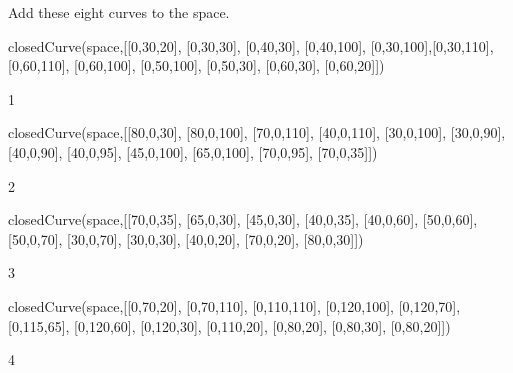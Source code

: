 \begin{xtc}
\begin{xtccomment}
Add these eight curves to the space.
\end{xtccomment}
\begin{spadsrc}
closedCurve(space,[[0,30,20], [0,30,30], [0,40,30], [0,40,100], [0,30,100],[0,30,110], [0,60,110], [0,60,100], [0,50,100], [0,50,30], [0,60,30], [0,60,20]]) 
\end{spadsrc}
\begin{TeXOutput}
\begin{fricasmath}{2}
1%
\end{fricasmath}
\end{TeXOutput}
\end{xtc}
\begin{xtc}
\begin{xtccomment}
\end{xtccomment}
\begin{spadsrc}
closedCurve(space,[[80,0,30], [80,0,100], [70,0,110], [40,0,110], [30,0,100], [30,0,90], [40,0,90], [40,0,95], [45,0,100], [65,0,100], [70,0,95], [70,0,35]]) 
\end{spadsrc}
\begin{TeXOutput}
\begin{fricasmath}{3}
2%
\end{fricasmath}
\end{TeXOutput}
\end{xtc}
\begin{xtc}
\begin{xtccomment}
\end{xtccomment}
\begin{spadsrc}
closedCurve(space,[[70,0,35], [65,0,30], [45,0,30], [40,0,35], [40,0,60], [50,0,60], [50,0,70], [30,0,70], [30,0,30], [40,0,20], [70,0,20], [80,0,30]]) 
\end{spadsrc}
\begin{TeXOutput}
\begin{fricasmath}{4}
3%
\end{fricasmath}
\end{TeXOutput}
\end{xtc}
\begin{xtc}
\begin{xtccomment}
\end{xtccomment}
\begin{spadsrc}
closedCurve(space,[[0,70,20], [0,70,110], [0,110,110], [0,120,100], [0,120,70], [0,115,65], [0,120,60], [0,120,30], [0,110,20], [0,80,20], [0,80,30], [0,80,20]]) 
\end{spadsrc}
\begin{TeXOutput}
\begin{fricasmath}{5}
4%
\end{fricasmath}
\end{TeXOutput}
\end{xtc}
